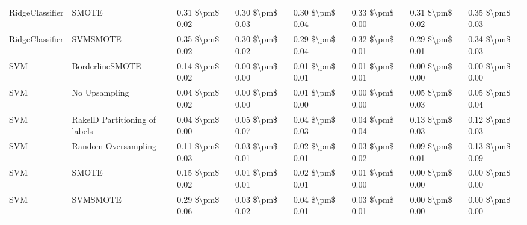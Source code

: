 \begin{tabular}{llllllll}
                RidgeClassifier &                         SMOTE & 0.31 \$\textbackslash pm\$ 0.02 &           0.30 \$\textbackslash pm\$ 0.03 &       0.30 \$\textbackslash pm\$ 0.04 &        0.33 \$\textbackslash pm\$ 0.00 &                         0.31 \$\textbackslash pm\$ 0.02 &     0.35 \$\textbackslash pm\$ 0.03 \\
                RidgeClassifier &                      SVMSMOTE & 0.35 \$\textbackslash pm\$ 0.02 &           0.30 \$\textbackslash pm\$ 0.02 &       0.29 \$\textbackslash pm\$ 0.04 &        0.32 \$\textbackslash pm\$ 0.01 &                         0.29 \$\textbackslash pm\$ 0.01 &     0.34 \$\textbackslash pm\$ 0.03 \\
                            SVM &               BorderlineSMOTE & 0.14 \$\textbackslash pm\$ 0.02 &           0.00 \$\textbackslash pm\$ 0.00 &       0.01 \$\textbackslash pm\$ 0.01 &        0.01 \$\textbackslash pm\$ 0.01 &                         0.00 \$\textbackslash pm\$ 0.00 &     0.00 \$\textbackslash pm\$ 0.00 \\
                            SVM &                 No Upsampling & 0.04 \$\textbackslash pm\$ 0.02 &           0.00 \$\textbackslash pm\$ 0.00 &       0.01 \$\textbackslash pm\$ 0.00 &        0.00 \$\textbackslash pm\$ 0.00 &                         0.05 \$\textbackslash pm\$ 0.03 &     0.05 \$\textbackslash pm\$ 0.04 \\
                            SVM & RakelD Partitioning of labels & 0.04 \$\textbackslash pm\$ 0.00 &           0.05 \$\textbackslash pm\$ 0.07 &       0.04 \$\textbackslash pm\$ 0.03 &        0.04 \$\textbackslash pm\$ 0.04 &                         0.13 \$\textbackslash pm\$ 0.03 &     0.12 \$\textbackslash pm\$ 0.03 \\
                            SVM &           Random Oversampling & 0.11 \$\textbackslash pm\$ 0.03 &           0.03 \$\textbackslash pm\$ 0.01 &       0.02 \$\textbackslash pm\$ 0.01 &        0.03 \$\textbackslash pm\$ 0.02 &                         0.09 \$\textbackslash pm\$ 0.01 &     0.13 \$\textbackslash pm\$ 0.09 \\
                            SVM &                         SMOTE & 0.15 \$\textbackslash pm\$ 0.02 &           0.01 \$\textbackslash pm\$ 0.01 &       0.02 \$\textbackslash pm\$ 0.01 &        0.01 \$\textbackslash pm\$ 0.00 &                         0.00 \$\textbackslash pm\$ 0.00 &     0.00 \$\textbackslash pm\$ 0.00 \\
                            SVM &                      SVMSMOTE & 0.29 \$\textbackslash pm\$ 0.06 &           0.03 \$\textbackslash pm\$ 0.02 &       0.04 \$\textbackslash pm\$ 0.01 &        0.03 \$\textbackslash pm\$ 0.01 &                         0.00 \$\textbackslash pm\$ 0.00 &     0.00 \$\textbackslash pm\$ 0.00 \\

\end{tabular}
